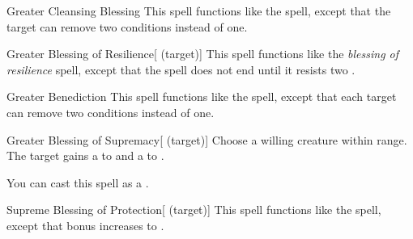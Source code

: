 \lowercase{\hypertarget{spell:Greater Cleansing Blessing}{}}\label{spell:Greater Cleansing Blessing}
\begin{freeability}[\nth{5}]{\hypertarget{spell:Greater Cleansing Blessing}{Greater Cleansing Blessing}}
This spell functions like the  spell, except that the target can remove two conditions instead of one.
\end{freeability}
\vspace{0.25em}



\lowercase{\hypertarget{spell:Greater Blessing of Resilience}{}}\label{spell:Greater Blessing of Resilience}
\begin{attuneability}[\nth{6}]{\hypertarget{spell:Greater Blessing of Resilience}{Greater Blessing of Resilience}}[ (target)]
This spell functions like the \textit{blessing of resilience} spell, except that the spell does not end until it resists two .
\end{attuneability}
\vspace{0.25em}



\lowercase{\hypertarget{spell:Greater Benediction}{}}\label{spell:Greater Benediction}
\begin{freeability}[\nth{7}]{\hypertarget{spell:Greater Benediction}{Greater Benediction}}
This spell functions like the  spell, except that each target can remove two conditions instead of one.
\end{freeability}
\vspace{0.25em}



\lowercase{\hypertarget{spell:Greater Blessing of Supremacy}{}}\label{spell:Greater Blessing of Supremacy}
\begin{attuneability}[\nth{7}]{\hypertarget{spell:Greater Blessing of Supremacy}{Greater Blessing of Supremacy}}[ (target)]
Choose a willing creature within \rngclose range.
The target gains a   to  and a   to .

You can cast this spell as a .
\end{attuneability}
\vspace{0.25em}



\lowercase{\hypertarget{spell:Supreme Blessing of Protection}{}}\label{spell:Supreme Blessing of Protection}
\begin{attuneability}[\nth{7}]{\hypertarget{spell:Supreme Blessing of Protection}{Supreme Blessing of Protection}}[ (target)]
This spell functions like the  spell, except that bonus increases to .
\end{attuneability}
\vspace{0.25em}



